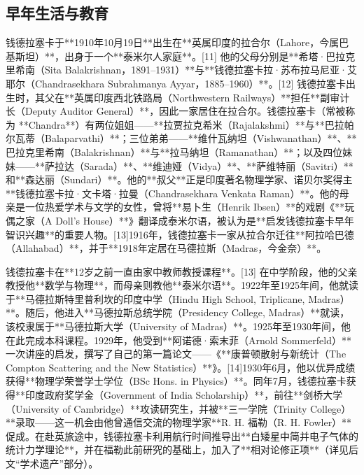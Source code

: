 \subsection{早年生活与教育}
钱德拉塞卡于**1910年10月19日**出生在**英属印度的拉合尔（Lahore，今属巴基斯坦）**，出身于一个**泰米尔人家庭**。[11] 他的父母分别是**希塔·巴拉克里希南（Sita Balakrishnan，1891–1931）**与**钱德拉塞卡拉·苏布拉马尼亚·艾耶尔（Chandrasekhara Subrahmanya Ayyar，1885–1960）**。[12] 钱德拉塞卡出生时，其父在**英属印度西北铁路局（Northwestern Railways）**担任**副审计长（Deputy Auditor General）**，因此一家居住在拉合尔。钱德拉塞卡（常被称为 **Chandra**）有两位姐姐——**拉贾拉克希米（Rajalakshmi）**与**巴拉帕尔瓦蒂（Balaparvathi）**；三位弟弟——**维什瓦纳坦（Vishwanathan）**、**巴拉克里希南（Balakrishnan）**与**拉马纳坦（Ramanathan）**；以及四位妹妹——**萨拉达（Sarada）**、**维迪娅（Vidya）**、**萨维特丽（Savitri）**和**森达丽（Sundari）**。他的**叔父**正是印度著名物理学家、诺贝尔奖得主**钱德拉塞卡拉·文卡塔·拉曼（Chandrasekhara Venkata Raman）**。他的母亲是一位热爱学术与文学的女性，曾将**易卜生（Henrik Ibsen）**的戏剧《**玩偶之家（A Doll’s House）**》翻译成泰米尔语，被认为是**启发钱德拉塞卡早年智识兴趣**的重要人物。[13]1916年，钱德拉塞卡一家从拉合尔迁往**阿拉哈巴德（Allahabad）**，并于**1918年定居在马德拉斯（Madras，今金奈）**。

钱德拉塞卡在**12岁之前一直由家中教师教授课程**。[13] 在中学阶段，他的父亲教授他**数学与物理**，而母亲则教他**泰米尔语**。1922年至1925年间，他就读于**马德拉斯特里普利坎的印度中学（Hindu High School, Triplicane, Madras）**。随后，他进入**马德拉斯总统学院（Presidency College, Madras）**就读，该校隶属于**马德拉斯大学（University of Madras）**。1925年至1930年间，他在此完成本科课程。1929年，他受到**阿诺德·索末菲（Arnold Sommerfeld）**一次讲座的启发，撰写了自己的第一篇论文——《**康普顿散射与新统计（The Compton Scattering and the New Statistics）**》。[14]1930年6月，他以优异成绩获得**物理学荣誉学士学位（BSc Hons. in Physics）**。同年7月，钱德拉塞卡获得**印度政府奖学金（Government of India Scholarship）**，前往**剑桥大学（University of Cambridge）**攻读研究生，并被**三一学院（Trinity College）**录取——这一机会由他曾通信交流的物理学家**R. H. 福勒（R. H. Fowler）**促成。在赴英旅途中，钱德拉塞卡利用航行时间推导出**白矮星中简并电子气体的统计力学理论**，并在福勒此前研究的基础上，加入了**相对论修正项**（详见后文“学术遗产”部分）。
